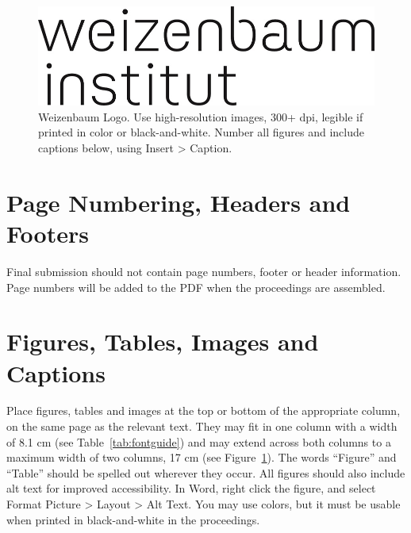 \documentclass{wzbconf}
\newcommand{\q}[1]{\enquote{#1}}
\begin{document}

\begin{figure}[ht]
  \centering
  \includegraphics[width=\textwidth,height=\textheight,keepaspectratio]{wzb}
  \caption{Weizenbaum Logo.  Use high-resolution images, 300+ dpi, legible if printed in color or black-and-white.  Number all figures and include captions below, using Insert > Caption.}
  \label{fig:logo}
\end{figure}


\section{Page Numbering, Headers and Footers}

Final submission should not contain page numbers, footer or header information.  Page numbers will be added to the PDF when the proceedings are assembled.

\section{Figures, Tables, Images and Captions}

Place figures, tables and images at the top or bottom of the appropriate column, on the same page as the relevant text.  They may fit in one column with a width of 8.1 cm (see Table~\ref{tab:fontguide}) and may extend across both columns to a maximum width of two columns, 17 cm (see Figure~\ref{fig:logo}).  The words \q{Figure} and \q{Table} should be spelled out wherever they occur.  All figures should also include alt text for improved accessibility.  In Word, right click the figure, and select Format Picture > Layout > Alt Text.  You may use colors, but it must be usable when printed in black-and-white in the proceedings.

\end{document}
